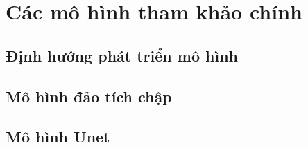 \chapter{Các mô hình tham khảo chính}
\section{Định hướng phát triển mô hình}
\section{Mô hình đảo tích chập}
\section{Mô hình Unet}

